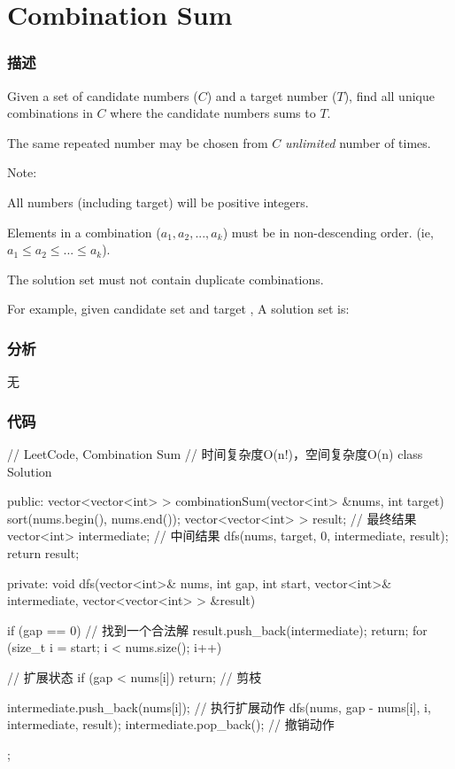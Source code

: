\section{Combination Sum} %
\label{sec:combination-sum}


\subsubsection{描述}
Given a set of candidate numbers ($C$) and a target number ($T$), find all unique combinations in $C$ where the candidate numbers sums to $T$.

The same repeated number may be chosen from $C$ \emph{unlimited} number of times.

Note:
\begindot
\item All numbers (including target) will be positive integers.
\item Elements in a combination ($a_1, a_2, ..., a_k$) must be in non-descending order. (ie, $a_1 \leq a_2 \leq ... \leq a_k$).
\item The solution set must not contain duplicate combinations.
\myenddot

For example, given candidate set  and target , 
A solution set is: 
\begin{Code}
	[7] 
	[2, 2, 3] 
\end{Code}


\subsubsection{分析}
无


\subsubsection{代码}
\begin{Code}
	// LeetCode, Combination Sum
	// 时间复杂度O(n!)，空间复杂度O(n)
	class Solution {
		public:
		vector<vector<int> > combinationSum(vector<int> &nums, int target) {
			sort(nums.begin(), nums.end());
			vector<vector<int> > result; // 最终结果
			vector<int> intermediate; // 中间结果
			dfs(nums, target, 0, intermediate, result);
			return result;
		}
		
		private:
		void dfs(vector<int>& nums, int gap, int start, vector<int>& intermediate,
		vector<vector<int> > &result) {
			if (gap == 0) {  // 找到一个合法解
				result.push_back(intermediate);
				return;
			}
			for (size_t i = start; i < nums.size(); i++) { // 扩展状态
				if (gap < nums[i]) return; // 剪枝
				
				intermediate.push_back(nums[i]); // 执行扩展动作
				dfs(nums, gap - nums[i], i, intermediate, result);
				intermediate.pop_back();  // 撤销动作
			}
		}
	};
\end{Code}


